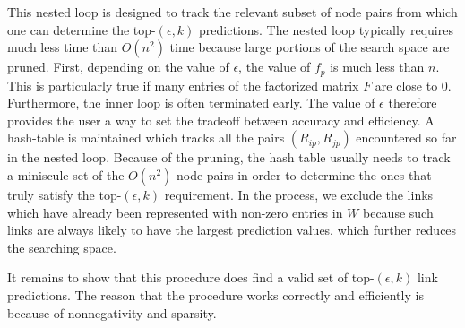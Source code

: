 This nested loop is designed to track the relevant subset of node
pairs from which one can determine the top-$(\epsilon, k)$
predictions.  The nested loop typically requires much less time than
$O(n^2)$ time because large portions of the search space are pruned.
First, depending on the value of $\epsilon$, the value of $f_p$ is
much less than $n$.  This is particularly true if many entries of
the factorized matrix $F$ are close to 0.  Furthermore, the inner
loop is often terminated early. The value of $\epsilon$ therefore
provides the user a way to set the tradeoff between accuracy and
efficiency. A hash-table is maintained which tracks all the pairs
$(R_{ip}, R_{jp})$ encountered so far in the nested loop. Because of
the pruning, the hash table usually needs to track a miniscule set
of the $O(n^2)$ node-pairs in order to determine the ones that truly satisfy the top-$(\epsilon, k)$ requirement. In the process, we exclude
the links which have already been represented with non-zero entries in $W$
because such links are always likely to have the largest prediction values,
which further reduces the searching space.


 It remains to show that this procedure  does find a valid set of  top-$(\epsilon,
k)$ link predictions. The reason that the procedure works correctly
and efficiently  is because of nonnegativity and sparsity.

